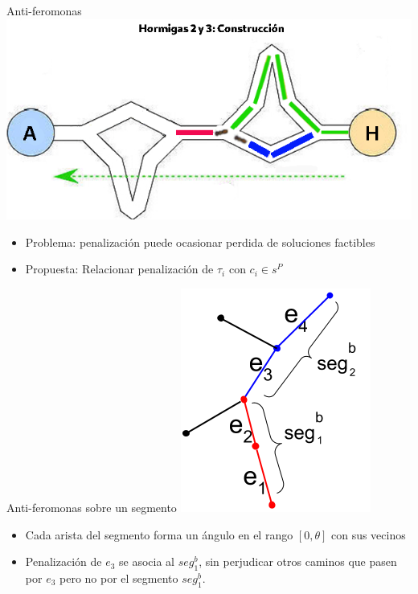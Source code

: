 \begin{frame}{Anti-feromonas}
\centering
\includegraphics[scale=0.4]{Pictures/ACO-ant-constr-penalize.png}
    \begin{itemize}
        \item Problema: penalizaci\'on puede ocasionar perdida de soluciones factibles
        \item Propuesta: Relacionar penalizaci\'on de $\tau_i$ con $c_i \in s^P$
    \end{itemize}
\end{frame}


\begin{frame}{Anti-feromonas sobre un segmento}
\centering
\includegraphics[scale=0.4]{Pictures/ant_segments_simple_case.png}
    \begin{itemize}
        \item Cada arista del segmento forma un \'angulo en el rango $[0, \theta]$ con sus vecinos
        \item Penalizaci\'on de $e_3$ se asocia al $seg^{b}_{1}$, sin perjudicar otros caminos que pasen por $e_3$ pero no por el segmento $seg^{b}_{1}$.
    \end{itemize}
\end{frame}

